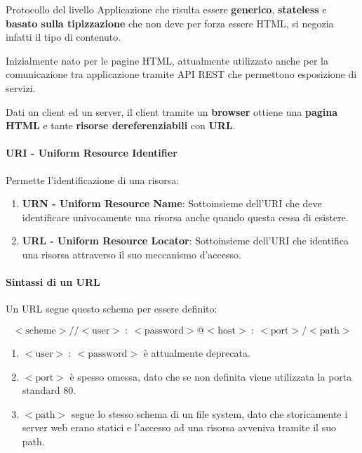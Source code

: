 \documentclass{article}
\begin{document}
Protocollo del livello Applicazione che risulta essere \textbf{generico}, \textbf{stateless} e \textbf{basato sulla tipizzazione} che non deve per forza essere HTML, si negozia infatti il tipo di contenuto.

\vspace*{10px}

Inizialmente nato per le pagine HTML, attualmente utilizzato anche per la comunicazione tra applicazione tramite API REST che permettono esposizione di servizi.

\vspace*{10px}

Dati un client ed un server, il client tramite un \textbf{browser} ottiene una \textbf{pagina HTML} e tante \textbf{risorse dereferenziabili} con \textbf{URL}.

\vspace*{20px}

\paragraph{URI - Uniform Resource Identifier} Permette l'identificazione di una risorsa:

\begin{enumerate}
    \item \textbf{URN - Uniform Resource Name}: Sottoinsieme dell'URI che deve identificare univocamente una risorsa anche quando questa cessa di esistere.
    \item \textbf{URL - Uniform Resource Locator}: Sottoinsieme dell'URI che identifica una risorsa attraverso il suo meccanismo d'accesso.
\end{enumerate}

\newpage

\paragraph{Sintassi di un URL} Un URL segue questo schema per essere definito:

\[ \boxed{<\text{scheme}> // <\text{user}> \::\: <\text{password}> \text{@} <\text{host}> \::\: <\text{port}>/<\text{path}>} \]

\begin{enumerate}
    \item $<\text{user}> \::\: <\text{password}>$ è attualmente deprecata.
    \item $<\text{port}>$ è spesso omessa, dato che se non definita viene utilizzata la porta standard $80$.
    \item $<\text{path}>$ segue lo stesso schema di un file system, dato che storicamente i server web erano statici e l'accesso ad una risorsa avveniva tramite il suo path.
\end{enumerate}
\end{document}
